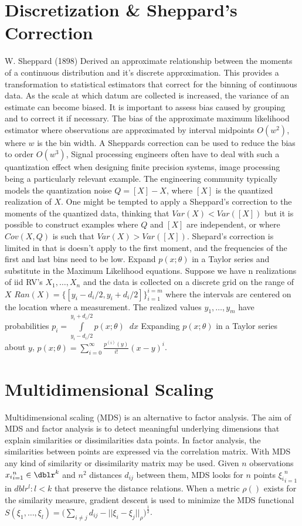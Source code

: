 \section{Discretization \& Sheppard's Correction}W. Sheppard (1898) Derived an approximate relationship between the moments of a continuous distribution and it's discrete approximation. This provides a transformation to statistical estimators that correct for the binning of continuous data.  As the scale at which datum are collected is increased, the variance of an estimate can become biased.  It is important to assess  bias caused by grouping and to correct it if necessary. The  bias of the approximate maximum likelihood estimator where observations are approximated by interval midpoints $O(w^2)$, where $w$ is the bin width. A Sheppards correction can be used to reduce the bias to order $O(w^3)$,  Signal processing engineers often have to deal with such a quantization effect when designing finite precision systems, image processing being a particularly relevant example. The engineering community typically models the quantization noise $Q=[X]-X$, where $[X]$ is the quantized realization of $X$. One might be tempted to apply a Sheppard's correction to the moments of the quantized data, thinking that $Var(X)<Var([X])$ but it is possible to construct examples where $Q$ and $[X]$ are independent, or where $Cov(X,Q)$ is such that $Var(X)>Var([X])$.  Shepard's correction is limited in that is doesn't apply to the first moment, and the frequencies of the first and last bins need to be low.  Expand $p(x;\theta)$ in a Taylor series and substitute in the Maximum Likelihood equations. \cite{Lindley, D. V. (1950)}  Suppose we have n realizations of iid RV's ${X_1, \hdots , X_n}$ and the data is collected on a discrete grid on the range of $X$ $Ran(X)=\{[y_i-d_i/2,y_i+d_i/2]\}_{i=1}^{i=m}$ where the intervals are centered on the location where a measurement. The realized values ${y_1, \hdots , y_m}$ have probabilities $p_i=\int\limits_{y_i - d_i /2}^{y_i+d_i /2} p(x;\theta) \;\; dx$ Expanding $p(x;\theta)$ in a Taylor series about $y$, $p(x;\theta)= \sum\limits_{i=0}^{\infty} \frac{p^{(i)}(y) }{i!} (x-y)^i$.


\section{Multidimensional Scaling}Multidimensional scaling (MDS) is an alternative to factor analysis. The aim of MDS and factor analysis is to detect meaningful underlying dimensions that explain similarities or dissimilarities data points. In factor analysis, the similarities between points are expressed via the correlation matrix. With MDS any kind of similarity or dissimilarity matrix may be used.  Given $n$ observations ${x_i}_{i=1}^{n} \in \dblr^k$ and $n^2$ distances $d_{ij}$ between them, MDS looks for $n$ points ${\xi_i}_{i=1}^{n}$ in $dblr^l : l<k$ that preserve the distance relations. When a metric $\rho()$ exists for the similarity measure, gradient descent is used to minimize the MDS functional $S(\xi_1, \ldots , \xi_l)=\biggl( \sum_{i \neq j} d_{ij}-||\xi_i-\xi_j||_{\rho}\biggr)^\frac{1}{2}$.


